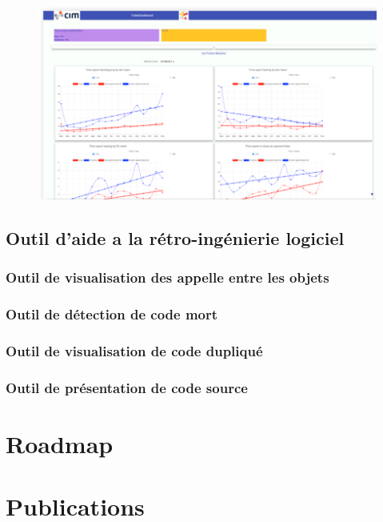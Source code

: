 \documentclass[a4paper]{article}
\begin{document}
\begin{figure}[htbp]
  \centering
  \includegraphics[width=\textwidth]{./figures/dashboard.png}
  \label{fig:dashboard}

\end{figure}
\subsection{Outil d'aide a la rétro-ingénierie logiciel}

\subsubsection{Outil de visualisation des appelle entre les objets }

\subsubsection{Outil de détection de code mort}

\subsubsection{Outil de visualisation de code dupliqué}

\subsubsection{Outil de présentation de code source}

\section{Roadmap}
\label{sec:roadmap}

\section{Publications}
\end{document}
